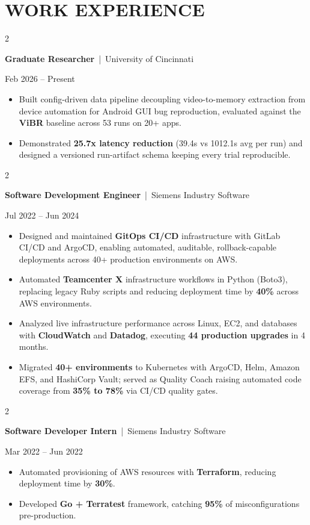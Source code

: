 \documentclass[10pt, letterpaper]{article}
\newenvironment{highlights}{
    \begin{itemize}[
        topsep=0.08 cm,
        parsep=0.04 cm,
        partopsep=0pt,
        itemsep=0.04 cm,
        leftmargin=12pt
    ]
}{
    \end{itemize}
}
\newenvironment{twocolentry}[2][]{
    \onecolentry
    \def\secondColumn{#2}
    \setcolumnwidth{\fill, 4.5 cm}
    \begin{paracol}{2}
}{
    \switchcolumn \raggedleft \secondColumn
    \end{paracol}
    \endonecolentry
}
\begin{document}
\section{WORK EXPERIENCE}
\begin{twocolentry}{Feb 2026 -- Present}
\textbf{Graduate Researcher} \,|\, University of Cincinnati
\end{twocolentry}
\begin{highlights}
  \item Built config-driven data pipeline decoupling video-to-memory extraction from device automation for Android GUI bug reproduction, evaluated against the \textbf{ViBR} baseline across 53 runs on 20+ apps.
  \item Demonstrated \textbf{25.7x latency reduction} (39.4s vs 1012.1s avg per run) and designed a versioned run-artifact schema keeping every trial reproducible.
\end{highlights}

\vspace{0.12 cm}

\begin{twocolentry}{Jul 2022 -- Jun 2024}
\textbf{Software Development Engineer} \,|\, Siemens Industry Software
\end{twocolentry}
\begin{highlights}
  \item Designed and maintained \textbf{GitOps CI/CD} infrastructure with GitLab CI/CD and ArgoCD, enabling automated, auditable, rollback-capable deployments across 40+ production environments on AWS.
  \item Automated \textbf{Teamcenter X} infrastructure workflows in Python (Boto3), replacing legacy Ruby scripts and reducing deployment time by \textbf{40\%} across AWS environments.
  \item Analyzed live infrastructure performance across Linux, EC2, and databases with \textbf{CloudWatch} and \textbf{Datadog}, executing \textbf{44 production upgrades} in 4 months.
  \item Migrated \textbf{40+ environments} to Kubernetes with ArgoCD, Helm, Amazon EFS, and HashiCorp Vault; served as Quality Coach raising automated code coverage from \textbf{35\% to 78\%} via CI/CD quality gates.
\end{highlights}

\vspace{0.12 cm}

\begin{twocolentry}{Mar 2022 -- Jun 2022}
\textbf{Software Developer Intern} \,|\, Siemens Industry Software
\end{twocolentry}
\begin{highlights}
  \item Automated provisioning of AWS resources with \textbf{Terraform}, reducing deployment time by \textbf{30\%}.
  \item Developed \textbf{Go + Terratest} framework, catching \textbf{95\%} of misconfigurations pre-production.
\end{highlights}
\end{document}
